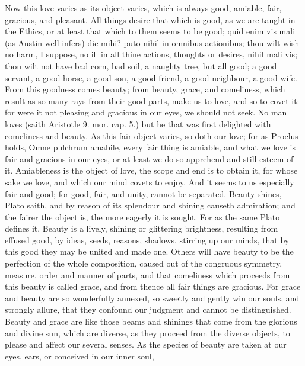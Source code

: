 {Now this love varies as its object varies, which is always good,
amiable, fair, gracious, and pleasant. All things desire that
which is good, as we are taught in the Ethics, or at least that which
to them seems to be good; quid enim vis mali (as Austin well infers)
dic mihi? puto nihil in omnibus actionibus; thou wilt wish no harm, I
suppose, no ill in all thine actions, thoughts or desires, nihil mali
vis; thou wilt not have bad corn, bad soil, a naughty tree, but
all good; a good servant, a good horse, a good son, a good friend, a
good neighbour, a good wife. From this goodness comes beauty; from
beauty, grace, and comeliness, which result as so many rays from their
good parts, make us to love, and so to covet it: for were it not
pleasing and gracious in our eyes, we should not seek. No man
loves (saith Aristotle 9. mor. cap. 5.) but he that was first delighted
with comeliness and beauty. As this fair object varies, so doth our
love; for as Proclus holds, Omne pulchrum amabile, every fair thing is
amiable, and what we love is fair and gracious in our eyes, or at least
we do so apprehend and still esteem of it.  Amiableness is the
object of love, the scope and end is to obtain it, for whose sake we
love, and which our mind covets to enjoy. And it seems to us especially
fair and good; for good, fair, and unity, cannot be separated. Beauty
shines, Plato saith, and by reason of its splendour and shining causeth
admiration; and the fairer the object is, the more eagerly it is
sought. For as the same Plato defines it, Beauty is a lively,
shining or glittering brightness, resulting from effused good, by
ideas, seeds, reasons, shadows, stirring up our minds, that by this
good they may be united and made one. Others will have beauty to be the
perfection of the whole composition, caused out of the congruous
symmetry, measure, order and manner of parts, and that comeliness which
proceeds from this beauty is called grace, and from thence all fair
things are gracious. For grace and beauty are so wonderfully annexed,
so sweetly and gently win our souls, and strongly allure, that
they confound our judgment and cannot be distinguished. Beauty and
grace are like those beams and shinings that come from the glorious and
divine sun, which are diverse, as they proceed from the diverse
objects, to please and affect our several senses. As the species
of beauty are taken at our eyes, ears, or conceived in our inner soul,
}
